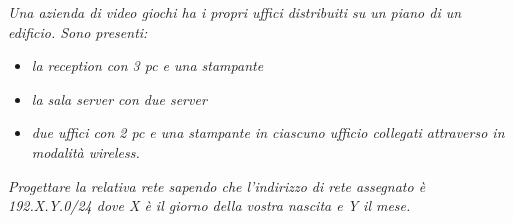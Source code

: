 \centering
\textit{Una azienda di video giochi ha i propri uffici distribuiti su un piano di un edificio. Sono presenti:}

\begin{center}
\begin{minipage}{0.5\textwidth}
\begin{itemize}

\item \textit{la reception con 3 pc e una stampante}
\item \textit{la sala server con due server}
\item \textit{due uffici con 2 pc e una stampante in ciascuno ufficio collegati attraverso in modalità wireless.}
\end{itemize}
\end{minipage}
\end{center}

\textit{Progettare la relativa rete sapendo che l’indirizzo di rete assegnato è 192.X.Y.0/24 dove X è il giorno della
vostra nascita e Y il mese.}